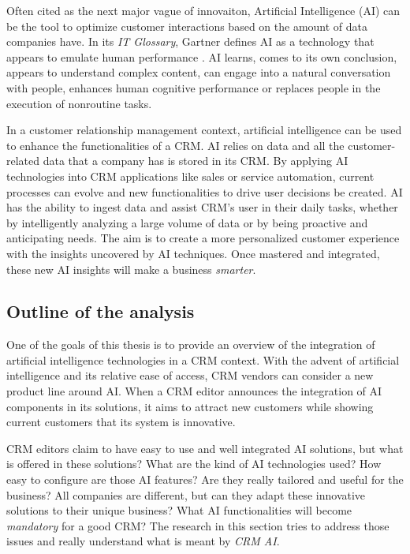 Often cited as the next major vague of innovaiton, Artificial Intelligence (AI) can be the tool to optimize customer interactions based on the amount of data companies have. In its \textit{IT Glossary}, Gartner defines AI as a technology that appears to emulate human performance \cite{gartner-glossary}. AI learns, comes to its own conclusion, appears to understand complex content, can engage into a natural conversation with people, enhances human cognitive performance or replaces people in the execution of nonroutine tasks.

In a customer relationship management context, artificial intelligence can be used to enhance the functionalities of a CRM. AI relies on data and all the customer-related data that a company has is stored in its CRM. By applying AI technologies into CRM applications like sales or service automation, current processes can evolve and new functionalities to drive user decisions be created. AI has the ability to ingest data and assist CRM's user in their daily tasks, whether by intelligently analyzing a large volume of data or by being proactive and anticipating needs. The aim is to create a more personalized customer experience with the insights uncovered by AI techniques. Once mastered and integrated, these new AI insights will make a business \textit{smarter}.


\subsection{Outline of the analysis}
One of the goals of this thesis is to provide an overview of the integration of artificial intelligence technologies in a CRM context. With the advent of artificial intelligence and its relative ease of access, CRM vendors can consider a new product line around AI. When a CRM editor announces the integration of AI components in its solutions, it aims to attract new customers while showing current customers that its system is innovative.

CRM editors claim to have easy to use and well integrated AI solutions, but what is offered in these solutions? What are the kind of AI technologies used? How easy to configure are those AI features? Are they really tailored and useful for the business? All companies are different, but can they adapt these innovative solutions to their unique business? What AI functionalities will become \textit{mandatory} for a good CRM? The research in this section tries to address those issues and really understand what is meant by \textit{CRM AI}.


